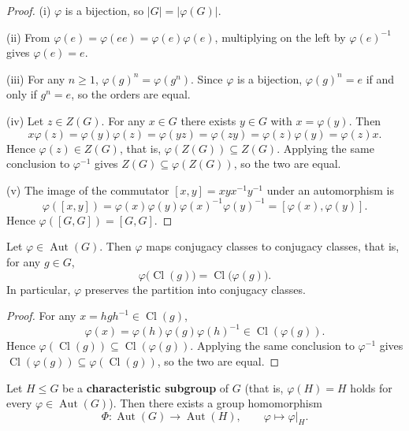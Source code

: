 \begin{proof}
(i) $\varphi$ is a bijection, so $|G| = |\varphi(G)|$.

(ii) From $\varphi(e) = \varphi(ee) = \varphi(e)\varphi(e)$, multiplying on the left by $\varphi(e)^{-1}$ gives $\varphi(e)=e$.

(iii) For any $n\ge 1$, $\varphi(g)^n = \varphi(g^n)$. Since $\varphi$ is a bijection, $\varphi(g)^n = e$ if and only if $g^n = e$, so the orders are equal.

(iv) Let $z\in Z(G)$. For any $x\in G$ there exists $y\in G$ with $x=\varphi(y)$. Then
\[
x\varphi(z) = \varphi(y)\varphi(z) = \varphi(yz) = \varphi(zy) = \varphi(z)\varphi(y) = \varphi(z)x.
\]
Hence $\varphi(z)\in Z(G)$, that is, $\varphi(Z(G))\subseteq Z(G)$. Applying the same conclusion to $\varphi^{-1}$ gives $Z(G)\subseteq\varphi(Z(G))$, so the two are equal.

(v) The image of the commutator $[x,y]=xyx^{-1}y^{-1}$ under an automorphism is
\[
\varphi([x,y]) = \varphi(x)\varphi(y)\varphi(x)^{-1}\varphi(y)^{-1} = [\varphi(x),\varphi(y)].
\]
Hence $\varphi([G,G]) = [G,G]$.
\end{proof}

\begin{property}\label{prop:automorphism_preserves_conjugacy}
Let $\varphi \in \operatorname{Aut}(G)$. Then $\varphi$ maps conjugacy classes to conjugacy classes, that is, for any $g\in G$,
\[
\varphi\bigl(\operatorname{Cl}(g)\bigr) = \operatorname{Cl}\bigl(\varphi(g)\bigr).
\]
In particular, $\varphi$ preserves the partition into conjugacy classes.
\end{property}

\begin{proof}
For any $x = hgh^{-1} \in \operatorname{Cl}(g)$,
\[
\varphi(x) = \varphi(h)\varphi(g)\varphi(h)^{-1} \in \operatorname{Cl}(\varphi(g)).
\]
Hence $\varphi(\operatorname{Cl}(g))\subseteq \operatorname{Cl}(\varphi(g))$. Applying the same conclusion to $\varphi^{-1}$ gives $\operatorname{Cl}(\varphi(g))\subseteq \varphi(\operatorname{Cl}(g))$, so the two are equal.
\end{proof}

\begin{lemma}\label{lem:automorphism_restricts_characteristic}
Let $H\le G$ be a \textbf{characteristic subgroup} of $G$ (that is, $\varphi(H)=H$ holds for every $\varphi\in\operatorname{Aut}(G)$). Then there exists a group homomorphism
\[
\Phi: \operatorname{Aut}(G) \to \operatorname{Aut}(H),\qquad \varphi \mapsto \varphi|_H.
\]
\end{lemma}


